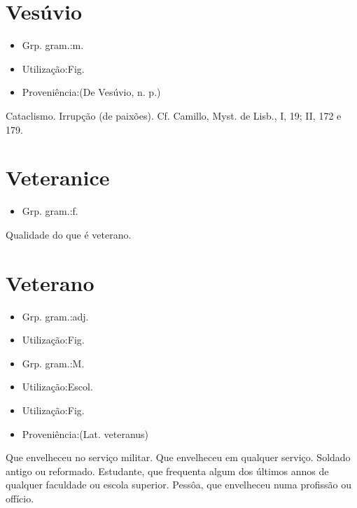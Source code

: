 \documentclass{article}
\begin{document}
\section{Vesúvio}
\begin{itemize}
\item {Grp. gram.:m.}
\end{itemize}
\begin{itemize}
\item {Utilização:Fig.}
\end{itemize}
\begin{itemize}
\item {Proveniência:(De \textunderscore Vesúvio\textunderscore , n. p.)}
\end{itemize}
Cataclismo.
Irrupção (de paixões). Cf. Camillo, \textunderscore Myst. de Lisb.\textunderscore , I, 19; II, 172 e 179.
\section{Veteranice}
\begin{itemize}
\item {Grp. gram.:f.}
\end{itemize}
Qualidade do que é veterano.
\section{Veterano}
\begin{itemize}
\item {Grp. gram.:adj.}
\end{itemize}
\begin{itemize}
\item {Utilização:Fig.}
\end{itemize}
\begin{itemize}
\item {Grp. gram.:M.}
\end{itemize}
\begin{itemize}
\item {Utilização:Escol.}
\end{itemize}
\begin{itemize}
\item {Utilização:Fig.}
\end{itemize}
\begin{itemize}
\item {Proveniência:(Lat. \textunderscore veteranus\textunderscore )}
\end{itemize}
Que envelheceu no serviço militar.
Que envelheceu em qualquer serviço.
Soldado antigo ou reformado.
Estudante, que frequenta algum dos últimos annos de qualquer faculdade ou escola superior.
Pessôa, que envelheceu numa profissão ou offício.
\end{document}
